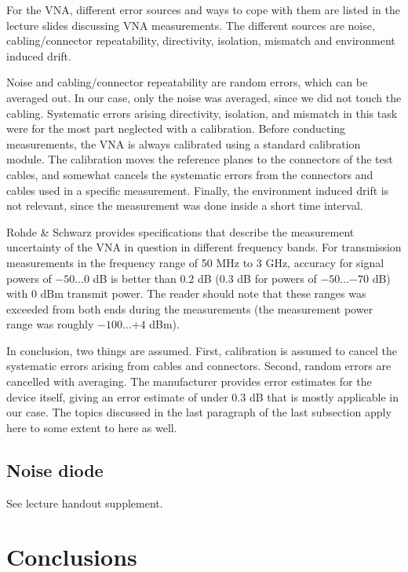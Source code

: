 \documentclass[a4paper, 12pt]{article}
\begin{document}
For the VNA, different error sources and ways to cope with them are listed in the 
lecture slides discussing VNA measurements. The different sources are noise, 
cabling/connector repeatability, directivity, isolation, mismatch and environment 
induced drift. 

Noise and cabling/connector repeatability are random errors, which can be averaged 
out. In our case, only the noise was averaged, since we did not touch the cabling. 
Systematic errors arising directivity, isolation, and mismatch in this task were
for the most part neglected with a calibration. Before conducting measurements, 
the VNA is always calibrated using a standard calibration module. The calibration 
moves the reference planes to the connectors of the test cables, and somewhat 
cancels the systematic errors from the connectors and cables used in a specific 
measurement. Finally, the environment induced drift is not relevant, since the 
measurement was done inside a short time interval.

Rohde \& Schwarz provides specifications that describe the measurement uncertainty 
of the VNA in question in different frequency bands. For transmission measurements 
in the frequency range of 50 MHz to 3 GHz, accuracy for signal powers of $-50 \ldots 0$ 
dB is better than $0.2$ dB ($0.3$ dB for powers of $-50 \ldots {-70}$ dB) with 0 dBm 
transmit power. \cite{vna} The reader should note that these ranges was exceeded 
from both ends during the measurements (the measurement power range was roughly 
$-100 \ldots {+4}$ dBm). 

In conclusion, two things are assumed. First, calibration is assumed to cancel the 
systematic errors arising from cables and connectors. Second, random errors are 
cancelled with averaging. The manufacturer provides error estimates for the device 
itself, giving an error estimate of under $0.3$ dB that is mostly applicable in 
our case. The topics discussed in the last paragraph of the last subsection apply 
here to some extent to here as well.


\subsection{Noise diode}

See lecture handout supplement.


\newpage
\section{Conclusions}
\end{document}
